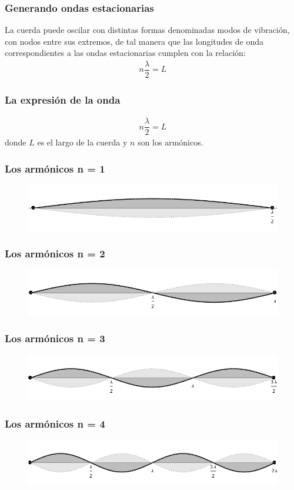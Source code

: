\documentclass[14pt]{beamer}
\begin{document}
\begin{frame}
\frametitle{Generando ondas estacionarias}
La cuerda puede oscilar con distintas formas denominadas modos de vibración, con nodos entre sus extremos, \pause de tal manera que las longitudes de onda correspondientes a las ondas estacionarias cumplen con la relación:
\pause
\begin{align}
n \dfrac{\lambda}{2} = L
\label{eq:ecuacion_01}
\end{align}
\end{frame}
\begin{frame}
\frametitle{La expresión de la onda}
\begin{align*}
n \dfrac{\lambda}{2} = L
\end{align*}
donde $L$ es el largo de la cuerda y $n$ son los armónicos.
\end{frame}
\begin{frame}
\frametitle{Los armónicos n = 1}
\begin{figure}
    \centering
    \includegraphics[width=\linewidth]{Imagenes/Practica_01_01.png}
\end{figure}
\end{frame}
\begin{frame}
\frametitle{Los armónicos n = 2}
\begin{figure}
    \centering
    \includegraphics[width=\linewidth]{Imagenes/Practica_01_02.png}
\end{figure}
\end{frame}
\begin{frame}
\frametitle{Los armónicos n = 3}
\begin{figure}
    \centering
    \includegraphics[width=\linewidth]{Imagenes/Practica_01_03.png}
\end{figure}
\end{frame}
\begin{frame}
\frametitle{Los armónicos n = 4}
\begin{figure}
    \centering
    \includegraphics[width=\linewidth]{Imagenes/Practica_01_04.png}
\end{figure}
\end{frame}
\end{document}
